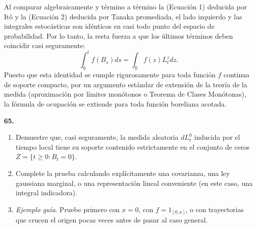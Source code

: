 \documentclass[11pt, letterpaper]{article}
\begin{document}
\begin{solucion}
    Al comparar algebraicamente y término a término la (Ecuación 1) deducida por Itô y la (Ecuación 2) deducida por Tanaka promediada, el lado izquierdo y las integrales estocásticas son idénticos en casi todo punto del espacio de probabilidad. 
    Por lo tanto, la resta fuerza a que los últimos términos deben coincidir casi seguramente:
    \[ \int_0^t f(B_s) ds = \int_{\mathbb{R}} f(z) L_t^z dz. \]
    Puesto que esta identidad se cumple rigurosamente para toda función $f$ continua de soporte compacto, por un argumento estándar de extensión de la teoría de la medida (aproximación por límites monótonos o Teorema de Clases Monótonas), la fórmula de ocupación se extiende para toda función boreliana acotada.
\end{solucion}

\newpage

\begin{ejercicio}
    \textbf{65.} 
    \begin{enumerate}
        \item Demuestre que, casi seguramente, la medida aleatoria $dL_{t}^{0}$ inducida por el tiempo local tiene su soporte contenido estrictamente en el conjunto de ceros $Z = \{t \ge 0 : B_{t} = 0\}$.
        \item Complete la prueba calculando explícitamente una covarianza, una ley gaussiana marginal, o una representación lineal conveniente (en este caso, una integral indicadora).
        \item \textit{Ejemplo guía}. Pruebe primero con $x=0$, con $f=1_{[0,a]}$, o con trayectorias que crucen el origen pocas veces antes de pasar al caso general.
    \end{enumerate}
\end{ejercicio}

\vspace{5mm}
\end{document}
